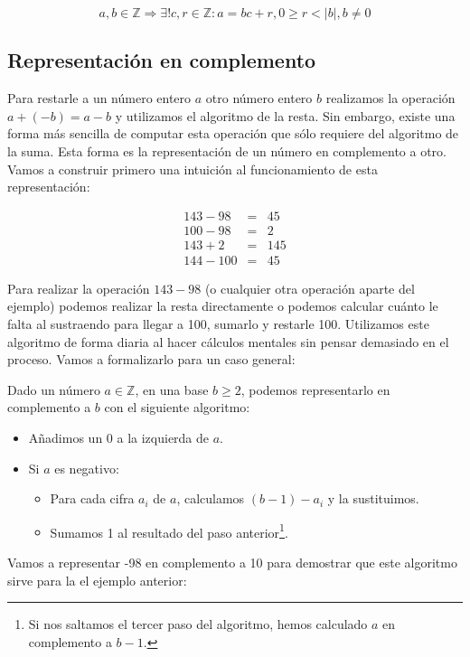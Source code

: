 \[a,b \in\mathbb{Z} \Rightarrow \exists! c,r \in\mathbb{Z} : a = bc + r, 0 \geq r < |b|, b \neq 0\]

\subsection{Representación en complemento}

Para restarle a un número entero $a$ otro número entero $b$ realizamos la operación $a + (-b) = a - b$ y utilizamos el algoritmo de la resta.
Sin embargo, existe una forma más sencilla de computar esta operación que sólo requiere del algoritmo de la suma.
Esta forma es la representación de un número en complemento a otro.
Vamos a construir primero una intuición al funcionamiento de esta representación:

\[
\begin{array}{rcl}
	143 - 98  & = & 45  \\
	100 - 98  & = & 2   \\
	143 + 2   & = & 145 \\
	144 - 100 & = & 45
\end{array}
\]

Para realizar la operación $143 - 98$ (o cualquier otra operación aparte del ejemplo) podemos realizar la resta directamente o podemos calcular cuánto le falta al sustraendo para llegar a 100, sumarlo y restarle 100.
Utilizamos este algoritmo de forma diaria al hacer cálculos mentales sin pensar demasiado en el proceso.
Vamos a formalizarlo para un caso general:

Dado un número $a \in\mathbb{Z}$, en una base $b \geq 2$, podemos representarlo en complemento a $b$ con el siguiente algoritmo:

\begin{itemize}
	\item Añadimos un 0 a la izquierda de $a$.
	\item Si $a$ es negativo:
	\begin{itemize}
		\item Para cada cifra $a_i$ de $a$, calculamos $(b-1) - a_i$ y la sustituimos.
		\item Sumamos 1 al resultado del paso anterior\footnote{%
			Si nos saltamos el tercer paso del algoritmo, hemos calculado $a$ en complemento a $b-1$.
		}.
	\end{itemize}
\end{itemize}

Vamos a representar -98 en complemento a 10 para demostrar que este algoritmo sirve para la el ejemplo anterior:

